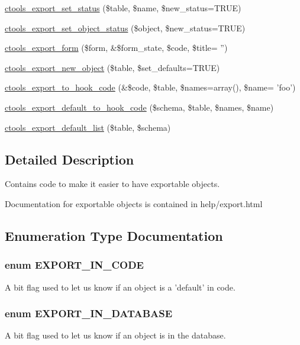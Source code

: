 \begin{DoxyCompactItemize}
\item 
\hyperlink{export_8inc_a310cf49738fe8143e3e164e8de811b8c}{ctools\_\-export\_\-set\_\-status} (\$table, \$name, \$new\_\-status=TRUE)
\item 
\hyperlink{export_8inc_a525db1d7117ac82873783e9e5e5f1ad0}{ctools\_\-export\_\-set\_\-object\_\-status} (\$object, \$new\_\-status=TRUE)
\item 
\hyperlink{export_8inc_aa4dfb26eccb717cb0f1287c29ae28499}{ctools\_\-export\_\-form} (\$form, \&\$form\_\-state, \$code, \$title= '')
\item 
\hyperlink{export_8inc_a0e4261d766bcde9653e2ea04551a997a}{ctools\_\-export\_\-new\_\-object} (\$table, \$set\_\-defaults=TRUE)
\item 
\hyperlink{export_8inc_a193d97a428b46c35a20fc0e8023fef62}{ctools\_\-export\_\-to\_\-hook\_\-code} (\&\$code, \$table, \$names=array(), \$name= 'foo')
\item 
\hyperlink{export_8inc_a3d760199cfd97c57824512913257d3a1}{ctools\_\-export\_\-default\_\-to\_\-hook\_\-code} (\$schema, \$table, \$names, \$name)
\item 
\hyperlink{export_8inc_a8da42c0a66938e72bd6651f03399e212}{ctools\_\-export\_\-default\_\-list} (\$table, \$schema)
\end{DoxyCompactItemize}


\subsection{Detailed Description}
Contains code to make it easier to have exportable objects.

Documentation for exportable objects is contained in help/export.html 

\subsection{Enumeration Type Documentation}
\hypertarget{export_8inc_a998643927da0d2855502bbd259cc8734}{
\subsubsection[{EXPORT\_\-IN\_\-CODE}]{\setlength{\rightskip}{0pt plus 5cm}enum {\bf EXPORT\_\-IN\_\-CODE}}}
\label{export_8inc_a998643927da0d2855502bbd259cc8734}
A bit flag used to let us know if an object is a 'default' in code. \hypertarget{export_8inc_ae857242c63a79d0a31b4b9d0e2f90b37}{
\subsubsection[{EXPORT\_\-IN\_\-DATABASE}]{\setlength{\rightskip}{0pt plus 5cm}enum {\bf EXPORT\_\-IN\_\-DATABASE}}}
\label{export_8inc_ae857242c63a79d0a31b4b9d0e2f90b37}
A bit flag used to let us know if an object is in the database. 

